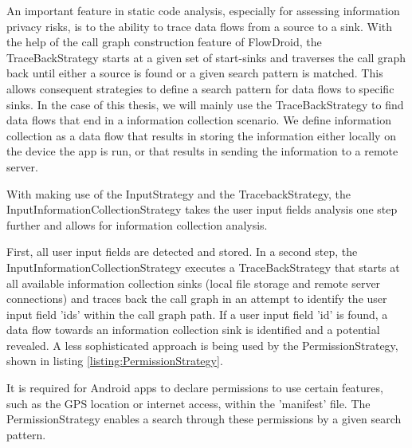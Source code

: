 An important feature in static code analysis, especially for assessing information privacy risks, is to the ability to trace data flows from a source to a sink.
With the help of the call graph construction feature of FlowDroid, the TraceBackStrategy starts at a given set of start-sinks and traverses the call graph back until either a source is found or a given search pattern is matched.
This allows consequent strategies to define a search pattern for data flows to specific sinks.
In the case of this thesis, we will mainly use the TraceBackStrategy to find data flows that end in a information collection scenario. 
We define information collection as a data flow that results in storing the information either locally on the device the app is run, or that results in sending the information to a remote server.
\newpage

With making use of the InputStrategy and the TracebackStrategy, the InputInformationCollectionStrategy takes the user input fields analysis one step further and allows for information collection analysis.

First, all user input fields are detected and stored. 
In a second step, the InputInformationCollectionStrategy executes a TraceBackStrategy that starts at all available information collection sinks (local file storage and remote server connections) and traces back the call graph in an attempt to identify the user input field 'ids' within the call graph path.
If a user input field 'id' is found, a data flow towards an information collection sink is identified and a potential \ipr revealed.
A less sophisticated approach is being used by the PermissionStrategy, shown in listing \ref{listing:PermissionStrategy}.

It is required for Android apps to declare permissions to use certain features, such as the \acs{GPS} location or internet access, within the 'manifest' file.
The PermissionStrategy enables a search through these permissions by a given search pattern.

